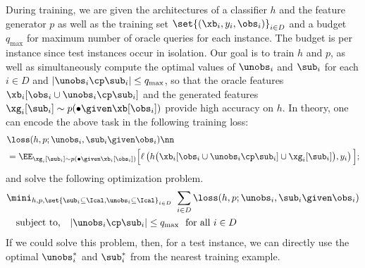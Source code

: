 \documentclass[letterpaper]{article}
\begin{document}
During training, we are given the architectures of a classifier $h$ and the feature generator $p$ as well as the training set $\set{(\xb_i,y_i,\obs_i)}_{i\in D}$ and a budget $q_{\max}$ for maximum number of oracle queries for each instance. The budget is per instance since test instances occur in isolation. Our goal is to train $h$ and $p$, as well as simultaneously compute the optimal values of $\unobs_i$  and $\sub_i$ for each $i\in D $ and $|\unobs_i \cp \sub_i| \le q_{\max}$,
so that the oracle features $\xb_i[\obs_i \cup \unobs_i \cp \sub_i]$  and the generated features $\xg_i[\sub_i] \sim p(\bullet \given \xb[\obs_i ])$ provide high accuracy on $h$. In theory, one can encode the above task in the following training 
loss:
\begin{align}
 &\loss(h,p; \unobs_i, \sub_i \given  \obs_i)\nn\\
 &= \EE_{\xg_i [\sub_i] \sim    p(\bullet \given \xb_i[\obs_i  ])} \Big[ \ell\left(h\big(\xb_i [\obs_i \cup \unobs_i \cp\sub_i] \cup \xg_i [\sub_i]\big), y_i\right)   \Big] \label{eq:loss}; 
\end{align}
and solve the following optimization problem.
\begin{align}
&     \mini_{h,p, \set{\sub_i \subseteq \Ical, \unobs_i \subseteq \Ical}_{i\in D}}\ \sum_{i\in D} \loss(h,p; \unobs_i, \sub_i \given  \obs_i)  \label{eq:obj}  \\
& \quad \text{subject to,} \quad   |\unobs_i \cp \sub_i| \le q_{\max} \ \ \text{for all } i\in D \label{eq:conn}
\end{align}
If we could solve this problem, then, for a test instance, we can directly use the optimal $\unobs^* _i$ and $\sub^* _i$ from the nearest training example.
\end{document}
